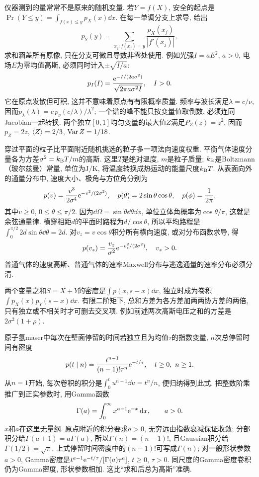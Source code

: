 仪器测到的量常常不是原来的随机变量. 若$Y=f(X)$, 安全的起点是$\Pr(Y\le y)=\int_{f(x)\le y}p_X(x)\dd x$. 在每一单调分支上求导, 给出
\[
p_Y(y)=\sum_{x_j:f(x_j)=y}\frac{p_X(x_j)}{|f'(x_j)|},
\]
求和涵盖所有原像, 只在分支可微且导数非零处使用. 例如光强$I=aE^2$, $a>0$, 电场$E$为零均值高斯, 必须同时计入$\pm\sqrt{I/a}$:
\[
p_I(I)=\frac{\mathrm e^{-I/(2a\sigma^2)}}{\sqrt{2\pi a\sigma^2 I}},\quad I>0.
\]
它在原点发散但可积, 这并不意味着原点有有限概率质量. 频率与波长满足$\lambda=c/\nu$, 因而$p_\lambda(\lambda)=c\,p_\nu(c/\lambda)/\lambda^2$; 一个谱的峰不能只按变量值取倒数, 必须连同Jacobian一起转换. 两个独立$[0,1]$均匀变量的最大值$Z$满足$P_Z(z)=z^2$, 因而$p_Z=2z$, $\langle Z\rangle=2/3$, $\operatorname{Var} Z=1/18$.

穿过平面的粒子比平面附近随机挑选的粒子多一项法向速度权重. 平衡气体速度分量各为方差$\sigma^2=k_{\mathrm B} T/m$的高斯. 这里$T$是绝对温度, $m$是粒子质量; $k_{\mathrm B}$是Boltzmann（玻尔兹曼）常量, 单位为$\mathrm{J/K}$, 将温度转换成热运动的能量尺度$k_{\mathrm B} T$. 从表面向外的通量分布中, 速度大小、极角与方位角分别为
\[
p(v)=\frac{v^3}{2\sigma^4}\mathrm e^{-v^2/(2\sigma^2)},\quad
p(\theta)=2\sin\theta\cos\theta,\quad p(\phi)=\frac1{2\pi},
\]
其中$v\ge0$, $0\le\theta\le\pi/2$. 因为$\dd\Omega=\sin\theta\dd\theta\dd\phi$, 单位立体角概率为$\cos\theta/\pi$, 这就是余弦通量律. 横穿相距$d$的平面时路程为$d/\cos\theta$, 所以平均路程是$\int_0^{\pi/2}2d\sin\theta\dd\theta=2d$. 对$v_z=v\cos\theta$积分所有横向速度, 或对分布函数求导, 得
\[
p(v_z)=\frac{v_z}{\sigma^2}\mathrm e^{-v_z^2/(2\sigma^2)},\quad v_z>0.
\]
普通气体的速度高斯、普通气体的速率Maxwell分布与逃逸通量的速率分布必须分清.

两个变量之和$S=X+Y$的密度是$\int p(x,s-x)\dd x$, 独立时成为卷积$\int p_X(x)p_Y(s-x)\dd x$. 有限二阶矩下, 总和方差为各方差加两两协方差的两倍, 只有独立或不相关时才可删去交叉项. 例如前述两次高斯电压之和的方差是$2\sigma^2(1+\rho)$.

原子氢maser中每次在壁面停留的时间若独立且为均值$\tau$的指数变量, $n$次总停留时间有密度
\[
p(t\mid n)=\frac{t^{n-1}}{(n-1)!\tau^n}\e^{-t/\tau},\quad t\ge0,\ n\ge1.
\]
从$n=1$开始, 每次卷积的积分是$\int_0^t u^{n-1}\dd u=t^n/n$, 便归纳得到此式. 把整数阶乘推广到正实参数时, 用Gamma函数
\[\Gamma(a)=\int_0^\infty x^{a-1}\mathrm e^{-x}\,\mathrm d x,\qquad a>0.\]
$x$和$a$在这里无量纲. 原点附近的积分要求$a>0$, 无穷远由指数衰减保证收敛; 分部积分给$\Gamma(a+1)=a\Gamma(a)$, 所以$\Gamma(n)=(n-1)!$, 且Gaussian积分给$\Gamma(1/2)=\sqrt\pi$. 上式停留时间密度中的$(n-1)!$可写成$\Gamma(n)$; 对一般形状参数$a>0$, Gamma密度是$t^{a-1}\mathrm e^{-t/\tau}/[\Gamma(a)\tau^a]$, $t\ge0$, $\tau>0$. 同尺度的Gamma密度卷积仍为Gamma密度, 形状参数相加. 这比“求和后总为高斯”准确.

